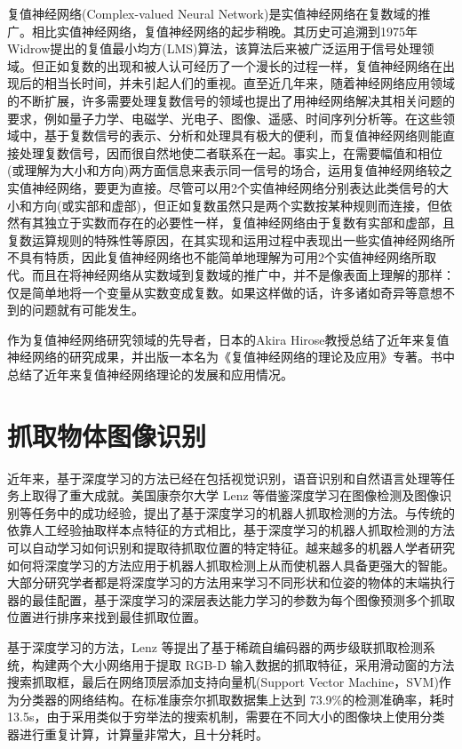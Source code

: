 \documentclass{yangthesis}
\begin{document}
复值神经网络(Complex-valued Neural Network)是实值神经网络在复数域的推广。相比实值神经网络，复值神经网络的起步稍晚。其历史可追溯到1975年Widrow提出的复值最小均方(LMS)算法，该算法后来被广泛运用于信号处理领域。但正如复数的出现和被人认可经历了一个漫长的过程一样，复值神经网络在出现后的相当长时间，并未引起人们的重视。直至近几年来，随着神经网络应用领域的不断扩展，许多需要处理复数信号的领域也提出了用神经网络解决其相关问题的要求，例如量子力学、电磁学、光电子、图像、遥感、时间序列分析等。在这些领域中，基于复数信号的表示、分析和处理具有极大的便利，而复值神经网络则能直接处理复数信号，因而很自然地使二者联系在一起。事实上，在需要幅值和相位(或理解为大小和方向)两方面信息来表示同一信号的场合，运用复值神经网络较之实值神经网络，要更为直接。尽管可以用2个实值神经网络分别表达此类信号的大小和方向(或实部和虚部)，但正如复数虽然只是两个实数按某种规则而连接，但依然有其独立于实数而存在的必要性一样，复值神经网络由于复数有实部和虚部，且复数运算规则的特殊性等原因，在其实现和运用过程中表现出一些实值神经网络所不具有特质，因此复值神经网络也不能简单地理解为可用2个实值神经网络所取代。而且在将神经网络从实数域到复数域的推广中，并不是像表面上理解的那样：仅是简单地将一个变量从实数变成复数。如果这样做的话，许多诸如奇异等意想不到的问题就有可能发生。

作为复值神经网络研究领域的先导者，日本的Akira Hirose教授总结了近年来复值神经网络的研究成果，并出版一本名为《复值神经网络的理论及应用》专著。书中总结了近年来复值神经网络理论的发展和应用情况。

\section{抓取物体图像识别}

近年来，基于深度学习的方法已经在包括视觉识别，语音识别和自然语言处理等任务上取得了重大成就。美国康奈尔大学 Lenz 等借鉴深度学习在图像检测及图像识别等任务中的成功经验，提出了基于深度学习的机器人抓取检测的方法。与传统的依靠人工经验抽取样本点特征的方式相比，基于深度学习的机器人抓取检测的方法可以自动学习如何识别和提取待抓取位置的特定特征。越来越多的机器人学者研究如何将深度学习的方法应用于机器人抓取检测上从而使机器人具备更强大的智能。大部分研究学者都是将深度学习的方法用来学习不同形状和位姿的物体的末端执行器的最佳配置，基于深度学习的深层表达能力学习的参数为每个图像预测多个抓取位置进行排序来找到最佳抓取位置。

基于深度学习的方法，Lenz 等提出了基于稀疏自编码器的两步级联抓取检测系统，构建两个大小网络用于提取 RGB-D 输入数据的抓取特征，采用滑动窗的方法搜索抓取框，最后在网络顶层添加支持向量机(Support Vector Machine，SVM)作为分类器的网络结构。在标准康奈尔抓取数据集上达到 73.9\%的检测准确率，耗时13.5s，由于采用类似于穷举法的搜索机制，需要在不同大小的图像块上使用分类器进行重复计算，计算量非常大，且十分耗时。
\end{document}
